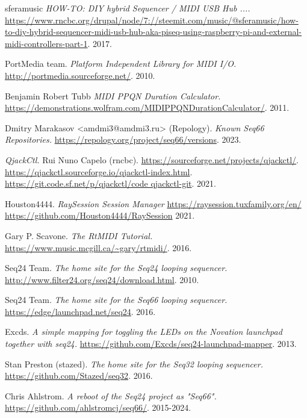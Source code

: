 {\begin{thebibliography}{99}
   sferamusic
   \emph{HOW-TO: DIY hybrid Sequencer / MIDI USB Hub ....}
   \url{https://www.rncbc.org/drupal/node/7://steemit.com/music/@sferamusic/how-to-diy-hybrid-sequencer-midi-usb-hub-aka-piseq-using-raspberry-pi-and-external-midi-controllers-part-1}.
   2017.

   PortMedia team.
   \emph{Platform Independent Library for MIDI I/O.}
   \url{http://portmedia.sourceforge.net/}.
   2010.

   Benjamin Robert Tubb
   \emph{MIDI PPQN Duration Calculator.}
   \url{https://demonstrations.wolfram.com/MIDIPPQNDurationCalculator/}.
   2011.

   Dmitry Marakasov <amdmi3@amdmi3.ru> (Repology).
   \emph{Known Seq66 Repositories.}
   \url{https://repology.org/project/seq66/versions}.
   2023.

   \emph{QjackCtl.}
   Rui Nuno Capelo (rncbc).
   \url{https://sourceforge.net/projects/qjackctl/}.
   \url{https://qjackctl.sourceforge.io/qjackctl-index.html}.
   \url{https://git.code.sf.net/p/qjackctl/code qjackctl-git}.
   2021.

   Houston4444.
   \emph{RaySession Session Manager}
   \url{https://raysession.tuxfamily.org/en/}
   \url{https://github.com/Houston4444/RaySession}
   2021.

   Gary P. Scavone.
   \emph{The RtMIDI Tutorial.}
   \url{https://www.music.mcgill.ca/~gary/rtmidi/}.
   2016.

   Seq24 Team.
   \emph{The home site for the Seq24 looping sequencer.}
   \url{http://www.filter24.org/seq24/download.html}.
   2010.

   Seq24 Team.
   \emph{The home site for the Seq66 looping sequencer.}
   \url{https://edge/launchpad.net/seq24}.
   2016.

   Excds.
   \emph{A simple mapping for toggling the LEDs on the Novation launchpad
   together with seq24.}
   \url{https://github.com/Excds/seq24-launchpad-mapper}.
   2013.

   Stan Preston (stazed).
   \emph{The home site for the Seq32 looping sequencer.}
   \url{https://github.com/Stazed/seq32}.
   2016.

   Chris Ahlstrom.
   \emph{A reboot of the Seq24 project as "Seq66".}
   \url{https://github.com/ahlstromcj/seq66/}.
   2015-2024.


\end{thebibliography}}

